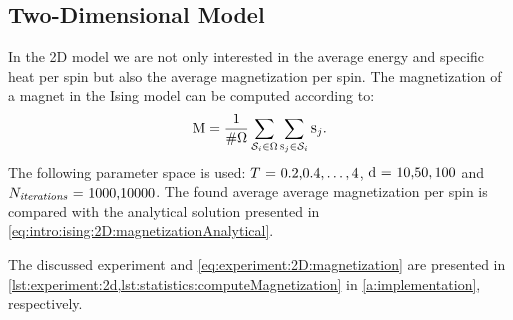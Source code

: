 \subsection{Two-Dimensional Model}
\label{ss:experiment:2D}
	In the 2D model we are not only interested in the average energy and specific heat per spin but also the average magnetization per spin. The magnetization of a magnet in the Ising model can be computed according to:
	\begin{equation}\label{eq:experiment:2D:magnetization}
		\mathrm{M} = \frac{1}{\#\Omega} \sum_{\mathcal{S}_{i} \in \Omega} \sum_{\textsc{s}_{j} \in \mathcal{S}_{i}} \textsc{s}_{j}.
	\end{equation}
	The following parameter space is used: $\mbox{\temperature = 0.2,} 0.4, \dotsc, 4$, $\mbox{\dimensionality = 10,} 50, 100$ and $\mbox{\numberOfIterations = 1000,} 10000$. The found average average magnetization per spin is compared with the analytical solution presented in \cref{eq:intro:ising:2D:magnetizationAnalytical}.

	The discussed experiment and \cref{eq:experiment:2D:magnetization} are presented in \cref{lst:experiment:2d,lst:statistics:computeMagnetization} in \cref{a:implementation}, respectively.